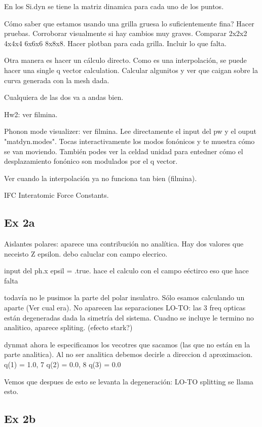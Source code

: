   En los Si.dyn se tiene la matriz dinamica para cada uno de los puntos.

  Cómo saber que estamos usando una grilla gruesa lo suficientemente fina? Hacer pruebas. Corroborar visualmente si hay cambios muy graves. Comparar 2x2x2 4x4x4 6x6x6 8x8x8. Hacer plotban para cada grilla. Incluir lo que falta.

  Otra manera es hacer un cálculo directo. Como es una interpolación, se puede hacer una single q vector calculation. Calcular algunitos y ver que caigan sobre la curva generada con la mesh dada.

  Cualquiera de las dos va a andas bien.

  Hw2: ver filmina.

  Phonon mode visualizer: ver filmina. Lee directamente el input del pw y el ouput "matdyn.modes". Tocas interactivamente los modos fonónicos y te muestra cómo se van moviendo. También podes ver la celdad unidad para entedner cómo el desplazamiento fonónico son modulados por el q vector.

  Ver cuando la interpolación ya no funciona tan bien (filmina).

  IFC Interatomic Force Constants.

\subsection{Ex 2a}

  Aislantes polares: aparece una contribución no analítica. Hay dos valores que neceisto Z epsilon. debo caluclar con campo elecrico.

  input del ph.x
  epsil = .true.
 hace el calculo con el campo eéctirco eso que hace falta

  todavía no le pusimos la parte del polar insulatro. Sólo esamos calculando un aparte (Ver cual era). No aparecen las separaciones LO-TO: las 3 freq opticas están degeneradas dada la simetría del sistema. Cuadno se incluye le termino no analitico, aparece spliting. (efecto stark?)

  dynmat ahora le especificamos los vecotres que sacamos (las que no están en la parte analitica). Al no ser analitica debemos decirle a direccion d aproximacion.
  q(1) = 1.0,
  7     q(2) = 0.0,
  8     q(3) = 0.0

  Vemos que despues de esto se levanta la degeneración: LO-TO splitting se llama esto.

\subsection{Ex 2b}

